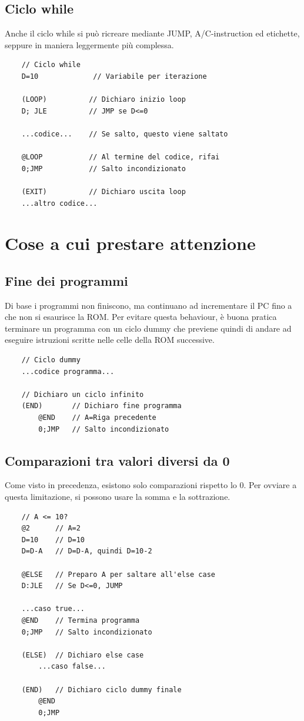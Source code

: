 \documentclass[12pt]{article}
\begin{document}
\pagebreak
\subsection{Ciclo while}
Anche il ciclo while si può ricreare mediante JUMP, A/C-instruction ed etichette, seppure in maniera leggermente più complessa.
\begin{lstlisting}
    // Ciclo while
    D=10             // Variabile per iterazione

    (LOOP)          // Dichiaro inizio loop
    D; JLE          // JMP se D<=0
    
    ...codice...    // Se salto, questo viene saltato

    @LOOP           // Al termine del codice, rifai
    0;JMP           // Salto incondizionato

    (EXIT)          // Dichiaro uscita loop
    ...altro codice...
\end{lstlisting}

\pagebreak
\section{Cose a cui prestare attenzione}

\subsection{Fine dei programmi}
Di base i programmi non finiscono, ma continuano ad incrementare il PC fino a che non si esaurisce la ROM.
Per evitare questa behaviour, è buona pratica terminare un programma con un ciclo dummy che previene quindi di andare ad eseguire istruzioni scritte nelle celle della ROM successive.
\begin{lstlisting}
    // Ciclo dummy
    ...codice programma...
    
    // Dichiaro un ciclo infinito
    (END)       // Dichiaro fine programma
        @END    // A=Riga precedente
        0;JMP   // Salto incondizionato
\end{lstlisting}

\subsection{Comparazioni tra valori diversi da 0}
Come visto in precedenza, esistono solo comparazioni rispetto lo 0. Per ovviare a questa limitazione, si possono usare la somma e la sottrazione.
\begin{lstlisting}
    // A <= 10?
    @2      // A=2
    D=10    // D=10
    D=D-A   // D=D-A, quindi D=10-2

    @ELSE   // Preparo A per saltare all'else case
    D:JLE   // Se D<=0, JUMP

    ...caso true...
    @END    // Termina programma
    0;JMP   // Salto incondizionato

    (ELSE)  // Dichiaro else case
        ...caso false...

    (END)   // Dichiaro ciclo dummy finale
        @END
        0;JMP
\end{lstlisting}
\end{document}
